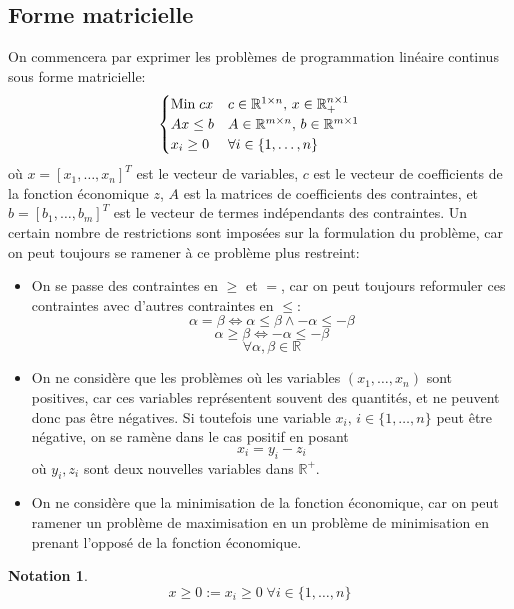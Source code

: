\documentclass[a4paper]{report}
\theoremstyle{definition}
\newtheorem*{notation}{Notation}
\theoremstyle{remark}
\theoremstyle{plain}
\begin{document}
\subsection{Forme matricielle}
On commencera par exprimer les problèmes de programmation linéaire continus sous
forme matricielle:
\[\begin{cases}
	\text{Min\;} cx & c\in\mathbb{R}^{1\times n},\, x\in\mathbb{R}^{n\times 1}_+
	\\
	Ax \le b        & A\in\mathbb{R}^{m\times n},\, b\in\mathbb{R}^{m\times 1}
	\\
	x_i \ge 0       & \forall i\in\{1,\dots,n\}
\end{cases}\]
où \(x=[x_1,\dots,x_n]^T\) est le vecteur de variables, \(c\) est le vecteur de coefficients de
la fonction économique \(z\), \(A\) est la matrices de coefficients des
contraintes, et \(b=[b_1,\dots,b_m]^T\) est le vecteur de termes indépendants des contraintes.
Un certain nombre de restrictions sont imposées sur la formulation du problème,
car on peut toujours se ramener à ce problème plus restreint:
\begin{itemize}
	\item On se passe des contraintes en \(\ge\) et \(=\), car on peut
	toujours reformuler ces contraintes avec d'autres contraintes en \(\le\):
	\[\alpha=\beta\Leftrightarrow \alpha\le\beta\land-\alpha\le-\beta\]
	\[\alpha\ge\beta\Leftrightarrow-\alpha\le-\beta\]
	\[\forall\alpha,\beta\in\mathbb{R}\]

	\item On ne considère que les  problèmes où les variables
	\((x_1,\dots,x_n)\) sont positives, car ces variables
	représentent souvent des quantités, et ne peuvent donc pas être négatives.
	Si toutefois une variable \(x_i,\,i\in\{1,\dots,n\}\) peut être négative, on se
	ramène dans le cas positif en posant
	\[x_i=y_i-z_i\]
	où \(y_i,z_i\) sont deux nouvelles variables dans \(\mathbb{R}^+\).

	\item On ne considère que la minimisation de la fonction
	économique, car on peut ramener un problème de maximisation en un
	problème de minimisation en prenant l'opposé de la fonction économique.
\end{itemize}

\begin{notation}
	\[x\ge 0 := x_i\ge 0\;\forall i\in\{1,\dots,n\}\]
\end{notation}
\end{document}
